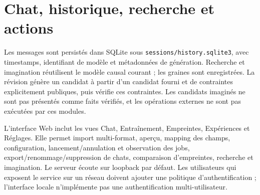 \documentclass[11pt,a4paper]{article}
\begin{document}
\section{Chat, historique, recherche et actions}
Les messages sont persistés dans SQLite sous \texttt{sessions/history.sqlite3}, avec timestamps, identifiant de modèle et métadonnées de génération. Recherche et imagination réutilisent le modèle causal courant ; les graines sont enregistrées. La révision génère un candidat à partir d'un candidat fourni et de contraintes explicitement publiques, puis vérifie ces contraintes. Les candidats imaginés ne sont pas présentés comme faits vérifiés, et les opérations externes ne sont pas exécutées par ces modules.

L'interface Web inclut les vues Chat, Entraînement, Empreintes, Expériences et Réglages. Elle permet import multi-format, aperçu, mapping des champs, configuration, lancement/annulation et observation des jobs, export/renommage/suppression de chats, comparaison d'empreintes, recherche et imagination. Le serveur écoute sur loopback par défaut. Les utilisateurs qui exposent le service sur un réseau doivent ajouter une politique d'authentification ; l'interface locale n'implémente pas une authentification multi-utilisateur.
\end{document}

